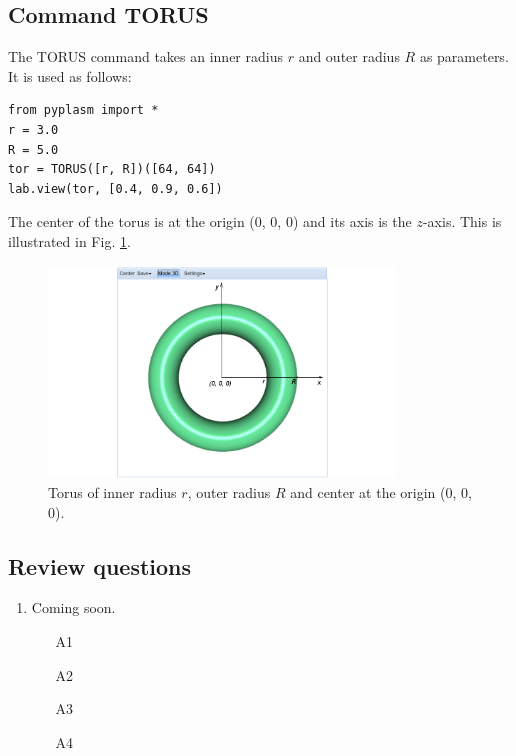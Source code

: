 \documentclass{article}
\begin{document}
\subsection{Command TORUS}

The TORUS command takes an inner radius $r$ and outer radius 
$R$ as parameters. It is used as follows:
\begin{verbatim}
from pyplasm import *
r = 3.0
R = 5.0
tor = TORUS([r, R])([64, 64])
lab.view(tor, [0.4, 0.9, 0.6])
\end{verbatim}
The center of the torus is at the origin (0, 0, 0) and its axis
is the $z$-axis. This is illustrated in Fig. \ref{fig:torus-1}.

\newpage

\begin{figure}[!ht]
\begin{center}
\includegraphics[width=0.82\textwidth]{img/torus-1.png}
\end{center}
\vspace{-2mm}
\caption{Torus of inner radius $r$, outer radius $R$ and center at the origin (0, 0, 0).}
\label{fig:torus-1}
\end{figure}

\subsection{Review questions}

\begin{enumerate}
\item Coming soon.
\begin{itemize}
\item[A1]
\item[A2]
\item[A3]
\item[A4]
\end{itemize}
\end{enumerate}
\end{document}
